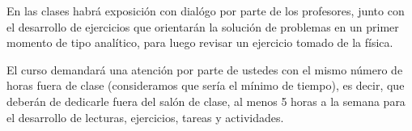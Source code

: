 \documentclass[12pt]{article}
\begin{document}
En las clases habrá exposición con dialógo por parte de los profesores, junto con el desarrollo de ejercicios que orientarán la solución de problemas en un primer momento de tipo analítico, para luego revisar un ejercicio tomado de la física.

\par
El curso demandará una atención por parte de ustedes con el mismo número de horas fuera de clase (consideramos que sería el mínimo de tiempo), es decir, que deberán de dedicarle fuera del salón de clase, al menos 5 horas a la semana para el desarrollo de lecturas, ejercicios, tareas y actividades.
\end{document}
